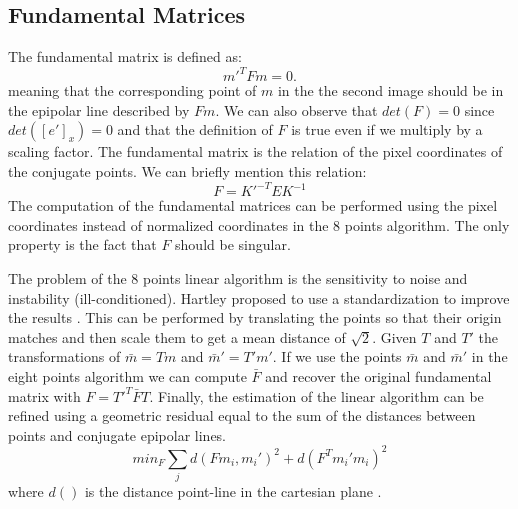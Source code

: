 \documentclass[11pt]{article}
\begin{document}
\subsection{Fundamental Matrices}
The fundamental matrix is defined as:
\begin{equation}
    m'^TFm = 0.
\end{equation}
meaning that the corresponding point of $m$ in the the second image should be in the epipolar line described by $Fm$. We can also observe that $det(F) = 0$ since $det([e']_x) = 0$ and that the definition of $F$ is true even if we multiply by a scaling factor. The fundamental matrix is the relation of the pixel coordinates of the conjugate points. We can briefly mention this relation:
\begin{equation}
    F = K'^{-T}EK^{-1}
\end{equation}
The computation of the fundamental matrices can be performed using the pixel coordinates instead of normalized coordinates in the 8 points algorithm. The only property is the fact that $F$ should be singular. 

\bigskip
The problem of the 8 points linear algorithm is the sensitivity to noise and instability (ill-conditioned). Hartley proposed to use a standardization to improve the results \cite{Hartley95}. This can be performed by translating the points so that their origin matches and then scale them to get a mean distance of $\sqrt2$.
Given $T$ and $T'$ the transformations of $\bar{m} = Tm$ and $\bar{m}' = T'm'$. If we use the points $\bar{m}$ and $\bar{m}'$ in the eight points algorithm we can compute $\bar{F}$ and recover the original fundamental matrix with $F = T'^{T}\bar{F}T$. Finally, the estimation of the linear algorithm can be refined using a geometric residual equal to the sum of the distances between points and conjugate epipolar lines.
\begin{equation}
    min_{F} 
 \sum_{j} d(Fm_i, m_i')^2 + d(F^Tm_i'm_i)^2
\end{equation}
where $d()$ is the distance point-line in the cartesian plane \cite{Luong}.
\end{document}
